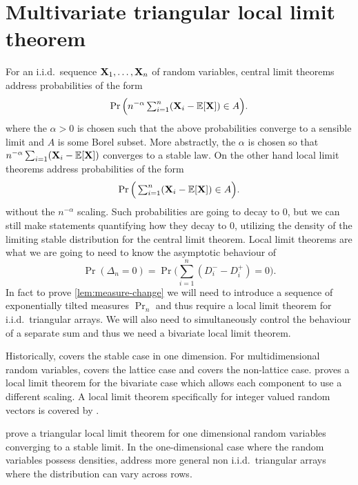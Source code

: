 \section{Multivariate triangular local limit theorem}
\label{chap:llt}

For an i.i.d.\ sequence ${\mathbf X}_1, \ldots, {\mathbf X}_n$ of random variables, central limit theorems address probabilities of the form
\begin{equation*}
    \Pr\Big( n^{-\alpha} \textstyle \sum_{i=1}^n ({\mathbf X}_i - {\mathbb E}[{\mathbf X}]) \in A \Big).
\end{equation*}
where the $\alpha > 0$ is chosen such that the above probabilities converge to a sensible limit and $A$ is some Borel subset. More abstractly, the $\alpha$ is chosen so that $n^{-\alpha} \sum_{i=1} ({\mathbf X}_i - {\mathbb E}[{\mathbf X}])$ converges to a stable law. On the other hand local limit theorems address probabilities of the form
\begin{equation*}
    \Pr\Big( \textstyle \sum_{i=1}^n ({\mathbf X}_i - {\mathbb E}[{\mathbf X}]) \in A \Big).
\end{equation*}
without the $n^{-\alpha}$ scaling. Such probabilities are going to decay to 0, but we can still make statements quantifying how they decay to 0, utilizing the density of the limiting stable distribution for the central limit theorem. Local limit theorems are what we are going to need to know the asymptotic behaviour of
\begin{equation*}
    \Pr(\Delta_n = 0) = \Pr\Big(\textstyle\sum_{i=1}^n (D_i^- - D_i^+) = 0\Big).
\end{equation*}
In fact to prove \cref{lem:measure-change} we will need to introduce a sequence of exponentially tilted measures $\Pr_n$ and thus require a local limit theorem for i.i.d.\ triangular arrays. We will also need to simultaneously control the behaviour of a separate sum and thus we need a bivariate local limit theorem.

Historically, \citet{gnedenkoLocalLimitTheorem1948} covers the stable case in one dimension. For multidimensional random variables, \citet{rvavceva1962domains} covers the lattice case and \citet{stoneLocalLimitTheorem1965} covers the non-lattice case. \citet{doneyBivariateLocalLimit1991} proves a local limit theorem for the bivariate case which allows each component to use a different scaling. A local limit theorem specifically for integer valued random vectors is covered by \citet{gamkrelidzeLocalLimitTheorem2015}.

\citet{jainLowerTailProbability1987} prove a triangular local limit theorem for one dimensional random variables converging to a stable limit. In the one-dimensional case where the random variables possess densities, \citet{korchinskyLocalLimitTheorem2007} address more general non i.i.d.\ triangular arrays where the distribution can vary across rows.

